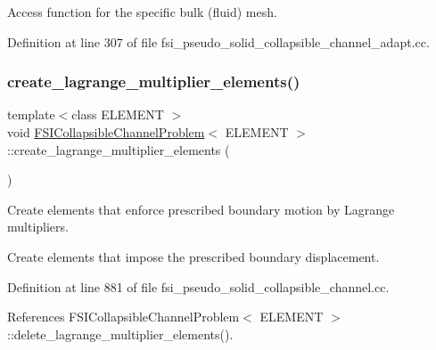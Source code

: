 Access function for the specific bulk (fluid) mesh. 



Definition at line 307 of file fsi\+\_\+pseudo\+\_\+solid\+\_\+collapsible\+\_\+channel\+\_\+adapt.\+cc.

\mbox{\label{classFSICollapsibleChannelProblem_a328465bc567702963e06c07f5550f80a}} 
\subsubsection{\texorpdfstring{create\+\_\+lagrange\+\_\+multiplier\+\_\+elements()}{create\_lagrange\_multiplier\_elements()}\hspace{0.1cm}{\footnotesize\ttfamily [1/2]}}
{\footnotesize\ttfamily template$<$class E\+L\+E\+M\+E\+NT $>$ \\
void \hyperlink{classFSICollapsibleChannelProblem}{F\+S\+I\+Collapsible\+Channel\+Problem}$<$ E\+L\+E\+M\+E\+NT $>$\+::create\+\_\+lagrange\+\_\+multiplier\+\_\+elements (\begin{DoxyParamCaption}{ }\end{DoxyParamCaption})\hspace{0.3cm}{\ttfamily [private]}}



Create elements that enforce prescribed boundary motion by Lagrange multipliers. 

Create elements that impose the prescribed boundary displacement. 

Definition at line 881 of file fsi\+\_\+pseudo\+\_\+solid\+\_\+collapsible\+\_\+channel.\+cc.



References F\+S\+I\+Collapsible\+Channel\+Problem$<$ E\+L\+E\+M\+E\+N\+T $>$\+::delete\+\_\+lagrange\+\_\+multiplier\+\_\+elements().

\mbox{\label{classFSICollapsibleChannelProblem_a328465bc567702963e06c07f5550f80a}} 
